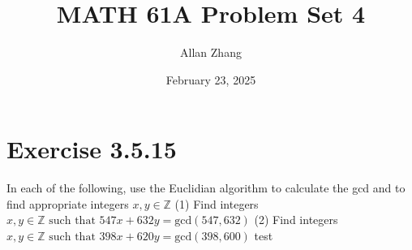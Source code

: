 \documentclass[hidelinks]{article}
\title{\textbf{MATH 61A Problem Set 4}}
\author{Allan Zhang}
\date{February 23, 2025}
\begin{document}
\hypersetup{bookmarksnumbered=true,}
\pagecolor{white}
\color{black}
\maketitle
\section*{Exercise 3.5.15}
In each of the following, use the Euclidian algorithm to calculate the gcd and to find appropriate integers $x, y \in \mathbb{Z}$
\newline
(1) Find integers $x, y \in \mathbb{Z} \text{ such that } 547x+632y = \text{gcd}(547, 632)$
\newline
(2) Find integers $x, y \in \mathbb{Z} \text{ such that } 398x+620y = \text{gcd}(398, 600)$
test
\end{document}
